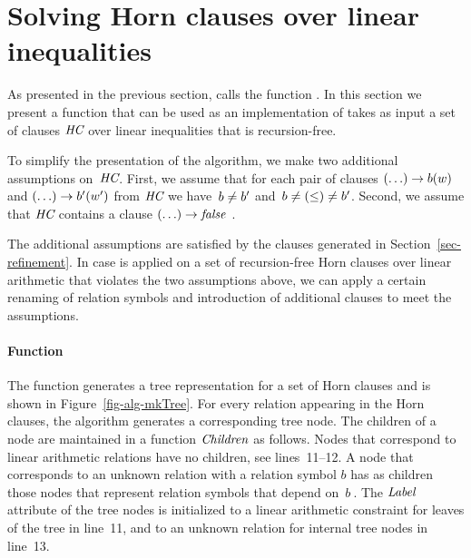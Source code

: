 \section{Solving Horn clauses over linear inequalities} \label{sec-horn-solving}

As presented in the previous section, \algRefine calls the function
\algSolveHornClauses.
In this section we present a function \algSolveLinearHornClauses that
can be used as an implementation of \algSolveHornClauses takes as
input a set of clauses $\textit{HC}$ over linear inequalities that is
recursion-free.

To simplify the presentation of the algorithm, we make two additional
assumptions on~$\textit{HC}$.
First, we assume that for each pair of clauses $(\dots\!\,) \rightarrow
b(w)$ and $(\dots\!\,) \rightarrow
b'(w')$ from $\textit{HC}$ we have~$b \neq
b'$ and~$b \neq (\leq)\neq b'$.
Second, we assume that $\textit{HC}$ contains a clause $(\dots\!\,)
\rightarrow \mathit{false}\ $. 

The additional assumptions are satisfied by the clauses generated in
Section~\ref{sec-refinement}.
In case \algSolveLinearHornClauses is applied on a set of
recursion-free Horn clauses over linear arithmetic that violates the
two assumptions above, we can apply a certain renaming of relation
symbols and introduction of additional clauses to meet the
assumptions.






\paragraph{Function \algMkHornTree} 

The function \algMkHornTree generates a tree representation for a set
of Horn clauses and is shown in Figure~\ref{fig-alg-mkTree}.
For every relation appearing in the Horn clauses, the algorithm
generates a corresponding tree node.
The children of a node are maintained in a function $\mathit{Children}$ as follows.
Nodes that correspond to linear arithmetic relations have no children,
see lines~11--12.
A node that corresponds to an unknown relation with a relation symbol
$b$ has as children those nodes that represent relation symbols that
depend on~$b\ $.
The $\mathit{Label}$ attribute of the tree nodes is initialized to a linear
arithmetic constraint for leaves of the tree in line~11, and to an
unknown relation for internal tree nodes in line~13.

